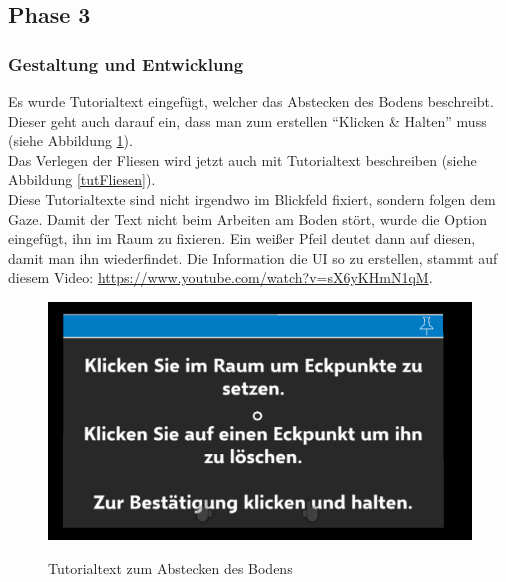 \subsection{Phase 3}

\subsubsection{Gestaltung und Entwicklung}

Es wurde Tutorialtext eingefügt, welcher das Abstecken des Bodens beschreibt. Dieser geht auch darauf ein, dass man zum erstellen \enquote{Klicken \& Halten} muss (siehe Abbildung \ref{tutBoden}). \\
Das Verlegen der Fliesen wird jetzt auch mit Tutorialtext beschreiben (siehe Abbildung \ref{tutFliesen}). \\
Diese Tutorialtexte sind nicht irgendwo im Blickfeld fixiert, sondern folgen dem Gaze. Damit der Text nicht beim Arbeiten am Boden stört, wurde die Option eingefügt, ihn im Raum zu fixieren. Ein weißer Pfeil deutet dann auf diesen, damit man ihn wiederfindet. Die Information die UI so zu erstellen, stammt auf diesem Video: \url{https://www.youtube.com/watch?v=sX6yKHmN1qM}.

\begin{figure}[h]
	\begin{center}
		\noindent\includegraphics[scale=0.4]{Resources/Artefakt/bodenText.png}
		\label{tutBoden}
		\caption{Tutorialtext zum Abstecken des Bodens}	
	\end{center}
\end{figure}

